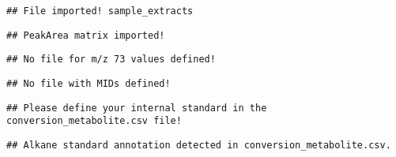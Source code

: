 \documentclass[9pt,]{article}
\begin{document}
\begin{verbatim}
## File imported! sample_extracts
\end{verbatim}

\begin{verbatim}
## PeakArea matrix imported!
\end{verbatim}

\begin{verbatim}
## No file for m/z 73 values defined!
\end{verbatim}

\begin{verbatim}
## No file with MIDs defined!
\end{verbatim}

\begin{verbatim}
## Please define your internal standard in the conversion_metabolite.csv file!
\end{verbatim}

\begin{verbatim}
## Alkane standard annotation detected in conversion_metabolite.csv.
\end{verbatim}
\newpage
\singlespacing 
\end{document}
